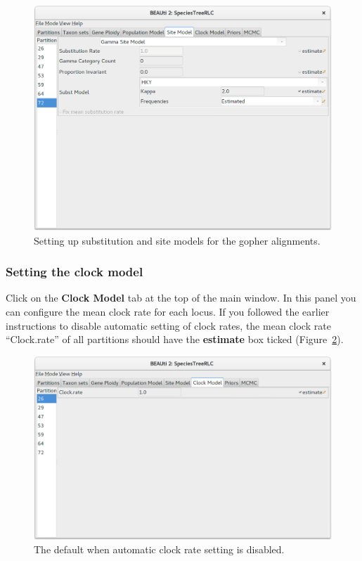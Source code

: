 \documentclass{article}
\begin{document}
\begin{figure}[htb!]
\centering
\includegraphics[width=\textwidth]{figures/beauti-hky.png}
\caption{Setting up substitution and site models for the gopher alignments.}
\label{fig:HKY}
\end{figure}

\subsubsection*{Setting the clock model}

Click on the \textbf{Clock Model} tab at the top of the main window. In this
panel you can configure the mean clock rate for each locus. If you followed the
earlier instructions to disable automatic setting of clock rates, the
mean clock rate ``Clock.rate'' of all partitions should have the
\textbf{estimate} box ticked (Figure~\ref{fig:clock}).

\begin{figure}[htb!]
\centering
\includegraphics[width=\textwidth]{figures/beauti-clock.png}
\caption{The default when automatic clock rate setting is disabled.}
\label{fig:clock}
\end{figure}
\end{document}
